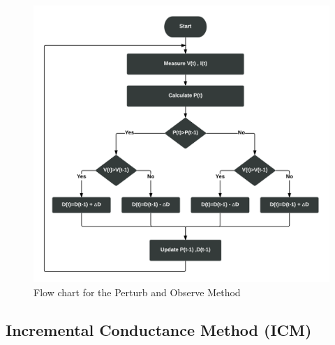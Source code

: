 {  
  \begin{figure}[H]
    \begin{center}
    \includegraphics[width=\textwidth]{images/pno_flow}
    \caption{Flow chart for the Perturb and Observe Method }
    \label{fig:PnO_flow}
    \end{center}
    \end{figure}
  
  \subsection{Incremental Conductance Method (ICM) } \label{sec:icm_sec}
 
}
